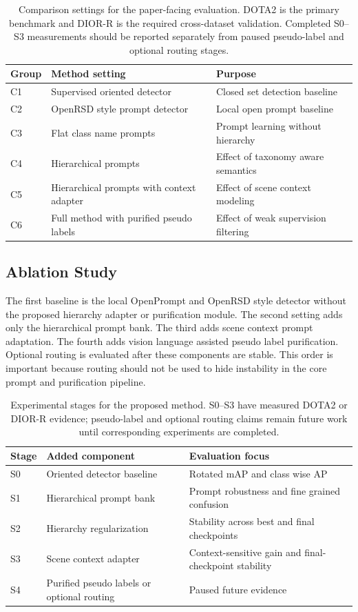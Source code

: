 \documentclass[10pt]{article}
\begin{document}
\begin{table}[t]
\centering
\small
\caption{Comparison settings for the paper-facing evaluation. DOTA2 is the primary benchmark and DIOR-R is the required cross-dataset validation. Completed S0--S3 measurements should be reported separately from paused pseudo-label and optional routing stages.}
\begin{tabular}{lll}
\toprule
Group & Method setting & Purpose \\
\midrule
C1 & Supervised oriented detector & Closed set detection baseline \\
C2 & OpenRSD style prompt detector & Local open prompt baseline \\
C3 & Flat class name prompts & Prompt learning without hierarchy \\
C4 & Hierarchical prompts & Effect of taxonomy aware semantics \\
C5 & Hierarchical prompts with context adapter & Effect of scene context modeling \\
C6 & Full method with purified pseudo labels & Effect of weak supervision filtering \\
\bottomrule
\end{tabular}
\label{tab:comparison}
\end{table}

\subsection{Ablation Study}

The first baseline is the local OpenPrompt and OpenRSD style detector without the proposed hierarchy adapter or purification module. The second setting adds only the hierarchical prompt bank. The third adds scene context prompt adaptation. The fourth adds vision language assisted pseudo label purification. Optional routing is evaluated after these components are stable. This order is important because routing should not be used to hide instability in the core prompt and purification pipeline.

\begin{table}[t]
\centering
\small
\caption{Experimental stages for the proposed method. S0--S3 have measured DOTA2 or DIOR-R evidence; pseudo-label and optional routing claims remain future work until corresponding experiments are completed.}
\begin{tabular}{lll}
\toprule
Stage & Added component & Evaluation focus \\
\midrule
S0 & Oriented detector baseline & Rotated mAP and class wise AP \\
S1 & Hierarchical prompt bank & Prompt robustness and fine grained confusion \\
S2 & Hierarchy regularization & Stability across best and final checkpoints \\
S3 & Scene context adapter & Context-sensitive gain and final-checkpoint stability \\
S4 & Purified pseudo labels or optional routing & Paused future evidence \\
\bottomrule
\end{tabular}
\label{tab:ablation}
\end{table}
\end{document}
